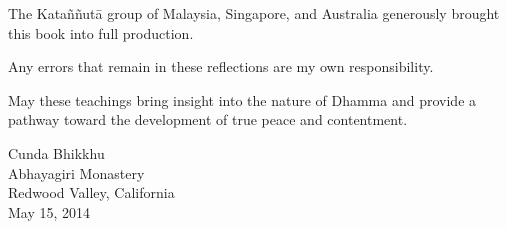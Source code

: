 The Kataññutā group of Malaysia, Singapore, and Australia generously 
brought this book into full production.

Any errors that remain in these reflections are my own responsibility.

May these teachings bring insight into the nature of Dhamma and provide 
a pathway toward the development of true peace and contentment.

\vspace{1.2em}

\noindent Cunda Bhikkhu\\
Abhayagiri Monastery\\
Redwood Valley, California\\
May 15, 2014

